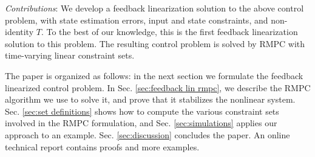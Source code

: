 \emph{Contributions}: We develop a feedback linearization solution to the above control problem, with state estimation errors, input and state constraints, and non-identity $T$.
To the best of our knowledge, this is the first feedback linearization solution to this problem.
The resulting control problem is solved by RMPC with time-varying linear constraint sets.

The paper is organized as follows: in the next section we formulate the feedback linearized control problem. In Sec. \ref{sec:feedback lin rmpc}, we describe the RMPC algorithm we use to solve it, and prove that it stabilizes the nonlinear system. 
Sec. \ref{sec:set definitions} shows how to compute the various constraint sets involved in the RMPC formulation, and Sec. \ref{sec:simulations} applies our approach to an example. Sec. \ref{sec:discussion} concludes the paper. 
An online technical report \cite{PantAM16_RMPC} contains proofs and more examples.